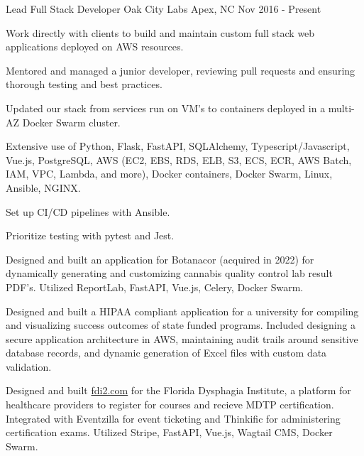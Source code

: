 

\begin{cventries}

  \cventry
    {Lead Full Stack Developer} %
    {Oak City Labs} %
    {Apex, NC} %
    {Nov 2016 - Present} %
    {
      \begin{cvitems} %
        \item {Work directly with clients to build and maintain custom full stack web applications deployed on AWS resources.}
        \item {Mentored and managed a junior developer, reviewing pull requests and ensuring thorough testing and best practices.}
        \item {Updated our stack from services run on VM's to containers deployed in a multi-AZ Docker Swarm cluster.}
        \item {Extensive use of Python, Flask, FastAPI, SQLAlchemy, Typescript/Javascript, Vue.js, PostgreSQL, AWS (EC2, EBS, RDS, ELB, S3, ECS, ECR, AWS Batch, IAM, VPC, Lambda, and more), Docker containers, Docker Swarm, Linux, Ansible, NGINX.}
        \item {Set up CI/CD pipelines with Ansible.}
        \item {Prioritize testing with pytest and Jest.}
        \item {Designed and built an application for Botanacor (acquired in 2022) for dynamically generating and customizing cannabis quality control lab result PDF's. Utilized ReportLab, FastAPI, Vue.js, Celery, Docker Swarm.}
        \item {Designed and built a HIPAA compliant application for a university for compiling and visualizing success outcomes of state funded programs. Included designing a secure application architecture in AWS, maintaining audit trails around sensitive database records, and dynamic generation of Excel files with custom data validation.}
        \item {Designed and built \href{https://fdi2.com}{fdi2.com} for the Florida Dysphagia Institute, a platform for healthcare providers to register for courses and recieve MDTP certification. Integrated with Eventzilla for event ticketing and Thinkific for administering certification exams. Utilized Stripe, FastAPI, Vue.js, Wagtail CMS, Docker Swarm.}

\end{cvitems}}
\end{cventries}
